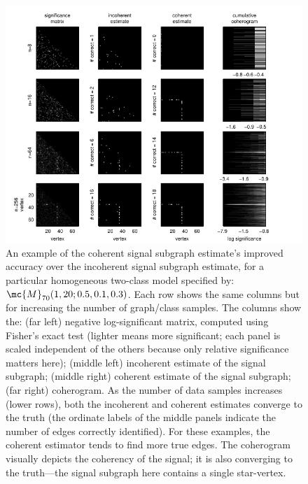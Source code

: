 \documentclass[10pt,journal,cspaper,compsoc]{IEEEtran}
\begin{document}
\begin{figure}[tb!]
	\centering
		\includegraphics[width=1.0\linewidth]{../figs/homo_V70_s20_p10_q30_SigIncCohErogram.pdf}
	\caption{An example of the coherent signal subgraph estimate's improved accuracy over the incoherent signal subgraph estimate, for a particular homogeneous two-class model specified by: $\mc{M}_{70}(1,20;0.5,0.1,0.3)$. Each row shows the same columns but for increasing the number of graph/class samples.  The columns show the: (far left) negative log-significant matrix, computed using Fisher's exact test (lighter means more significant; each panel is scaled independent of the others because only relative significance matters here); (middle left) incoherent estimate of the signal subgraph; (middle right) coherent estimate of the signal subgraph; (far right) coherogram.  As the number of data samples increases (lower rows), both the incoherent and coherent estimates converge to the truth (the ordinate labels of the middle panels indicate the number of edges correctly identified).  For these examples, the coherent estimator tends to find more true edges.  The coherogram visually depicts the coherency of the signal; it is also converging to the truth---the signal subgraph here contains a single star-vertex.}
	\label{fig:4x4}
\end{figure}
\end{document}
